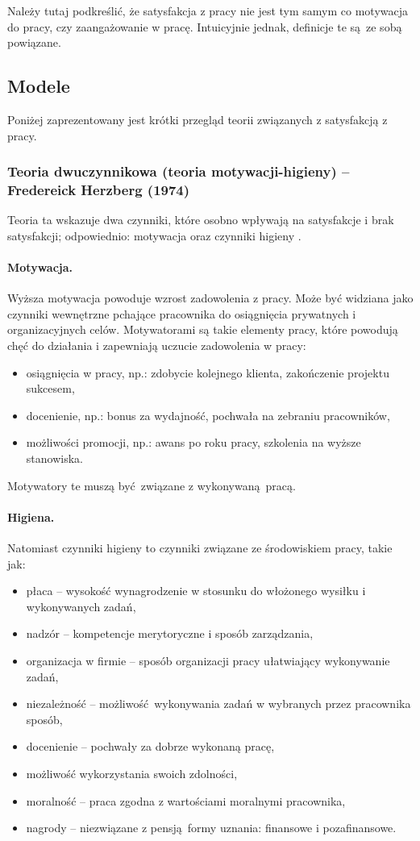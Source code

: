 Należy tutaj podkreślić, że satysfakcja z pracy nie jest tym samym co motywacja do pracy, czy zaangażowanie w pracę. Intuicyjnie jednak, definicje te są ze sobą powiązane.

\subsection{Modele}
Poniżej zaprezentowany jest krótki przegląd teorii związanych z satysfakcją z pracy.

\subsubsection{Teoria dwuczynnikowa (teoria motywacji-higieny) -- Fredereick Herzberg (1974)}
\label{sec:theory-sat-herz}
Teoria ta wskazuje dwa czynniki, które osobno wpływają na satysfakcje i brak satysfakcji; odpowiednio: motywacja oraz czynniki higieny \cite{herzberg1974motivation}. 

\paragraph{Motywacja.} Wyższa motywacja powoduje wzrost zadowolenia z pracy. Może być widziana jako czynniki wewnętrzne pchające pracownika do osiągnięcia prywatnych i organizacyjnych celów. Motywatorami są takie elementy pracy, które powodują chęć do działania i zapewniają uczucie zadowolenia w pracy:
\begin{itemize}
\item osiągnięcia w pracy, np.: zdobycie kolejnego klienta, zakończenie projektu sukcesem,
\item docenienie, np.: bonus za wydajność, pochwała na zebraniu pracowników,
\item możliwości promocji, np.: awans po roku pracy, szkolenia na wyższe stanowiska.
\end{itemize}
Motywatory te muszą być związane z wykonywaną pracą.

\paragraph{Higiena.} Natomiast czynniki higieny to czynniki związane ze środowiskiem pracy, takie jak:
\begin{itemize}
\item płaca -- wysokość wynagrodzenie w stosunku do włożonego wysiłku i wykonywanych zadań, 
\item nadzór -- kompetencje merytoryczne i sposób zarządzania,
\item organizacja w firmie -- sposób organizacji pracy ułatwiający wykonywanie zadań, 
\item niezależność -- możliwość wykonywania zadań w wybranych przez pracownika sposób,
\item docenienie -- pochwały za dobrze wykonaną pracę,
\item możliwość wykorzystania swoich zdolności,
\item moralność -- praca zgodna z wartościami moralnymi pracownika,
\item nagrody -- niezwiązane z pensją formy uznania: finansowe i pozafinansowe.
\end{itemize}

